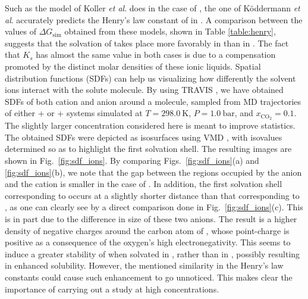 \documentclass[3p,twocolumn]{elsarticle}
\providecommand{\DIFadd}[1]{{\protect\color{blue}\uwave{#1}}} %
\providecommand{\DIFdel}[1]{{\protect\color{red}\sout{#1}}}                      %
\providecommand{\DIFaddbegin}{} %
\providecommand{\DIFaddend}{} %
\providecommand{\DIFdelbegin}{} %
\providecommand{\DIFdelend}{} %
\newcommand{\DIFscaledelfig}{0.5}
\newlength{\DIFdelgraphicswidth} %
\newlength{\DIFdelgraphicsheight} %
\newcommand{\DIFaddincludegraphics}[2][]{{\color{blue}\fbox{\DIFOincludegraphics[#1]{#2}}}} %
\newcommand{\DIFdelincludegraphics}[2][]{%
\sbox{\DIFdelgraphicsbox}{\DIFOincludegraphics[#1]{#2}}%
\settoboxwidth{\DIFdelgraphicswidth}{\DIFdelgraphicsbox} %
\settoboxtotalheight{\DIFdelgraphicsheight}{\DIFdelgraphicsbox} %
\scalebox{\DIFscaledelfig}{%
\parbox[b]{\DIFdelgraphicswidth}{\usebox{\DIFdelgraphicsbox}\\[-\baselineskip] \rule{\DIFdelgraphicswidth}{0em}}\llap{\resizebox{\DIFdelgraphicswidth}{\DIFdelgraphicsheight}{%
\setlength{\unitlength}{\DIFdelgraphicswidth}%
\begin{picture}(1,1)%
\thicklines\linethickness{2pt} %
{\color[rgb]{1,0,0}\put(0,0){\framebox(1,1){}}}%
{\color[rgb]{1,0,0}\put(0,0){\line( 1,1){1}}}%
{\color[rgb]{1,0,0}\put(0,1){\line(1,-1){1}}}%
\end{picture}%
}\hspace*{3pt}}} %
} %
\DeclareRobustCommand{\DIFaddbegin}{\DIFOaddbegin \let\includegraphics\DIFaddincludegraphics} %
\DeclareRobustCommand{\DIFaddend}{\DIFOaddend \let\includegraphics\DIFOincludegraphics} %
\DeclareRobustCommand{\DIFdelbegin}{\DIFOdelbegin \let\includegraphics\DIFdelincludegraphics} %
\DeclareRobustCommand{\DIFdelend}{\DIFOaddend \let\includegraphics\DIFOincludegraphics} %
\begin{document}
Such as the model of Koller \textit{et al}. \cite{Koller_2012} does in the case of \ce{[emim][B(CN)_4]}, the one of K\"{o}ddermann \textit{et al}. \cite{Koddermann_2007} accurately predicts the Henry's law constant of  in \ce{[emim][NTf_2]}.
A comparison between the values of $\Delta G_\text{sim}$ obtained from these models, shown in Table \ref{table:henry}, suggests that the solvation of  takes place more favorably in \ce{[emim][B(CN)_4]} than in \ce{[emim][NTf_2]}.
The fact that $K_s$ has almost the same value in both cases is due to a compensation promoted by the distinct molar densities of these ionic liquids.
Spatial distribution functions (SDFs) \cite{Svishchev_1993} can help us visualizing how differently the solvent ions interact with the solute molecule.
By using TRAVIS \cite{Brehm_2011}, we have obtained SDFs of both cation and anion around a  molecule, sampled from MD trajectories of either +\ce{[emim][B(CN)_4]} or +\ce{[emim][NTf_2]} systems simulated at $T = 298.0~\text{K}$, \DIFdelbegin \DIFdel{$P = 1.0~\mathrm{bar}$}\DIFdelend \DIFaddbegin \DIFadd{$p = 0.1~\mathrm{MPa}$}\DIFaddend , and $x_\mathrm{CO_2} = 0.1$.
The slightly larger  concentration considered here is meant to improve statistics.
The obtained SDFs were depicted as isosurfaces using VMD \cite{HUMP96}, with isovalues determined so as to highlight the first solvation shell.
The resulting images are shown in Fig.~\ref{fig:sdf_ions}.
By comparing Figs.~\ref{fig:sdf_ions}(a) and \ref{fig:sdf_ions}(b), we note that the gap between the regions occupied by the anion and the cation is smaller in the case of \ce{[emim][B(CN)_4]}.
In addition, the first solvation shell corresponding to \ce{[B(CN)_4]^-} occurs at a slightly shorter distance than that corresponding to \ce{[NTf_2]^-}, as one can clearly see by a direct comparison done in Fig.~\ref{fig:sdf_ions}(c).
This is in part due to the difference in size of these two anions.
The result is a higher density of negative charges around the carbon atom of , whose point-charge is positive as a consequence of the oxygen's high electronegativity.
This seems to induce a greater stability of  when solvated in \ce{[emim][B(CN)_4]}, rather than in \ce{[emim][NTf_2]}, possibly resulting in enhanced solubility.
However, the mentioned similarity in the Henry's law constants could cause such enhancement to go unnoticed.
This makes clear the importance of carrying out a study at high  concentrations.
\end{document}
